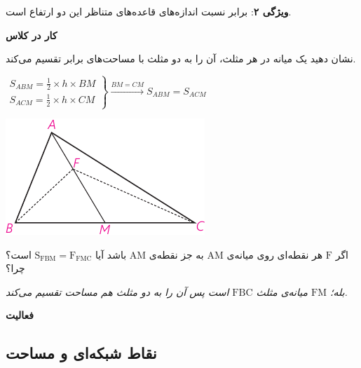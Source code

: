 \documentclass[12pt, a4paper]{book}
\begin{document}
 \bigskip

\textbf{ویژگی ۲}:
 برابر نسبت اندازه‌های قاعده‌های متناظر این دو ارتفاع است.
 \bigskip
 
 \textbf{کار در کلاس}
 
 \begin{minipage}{0.65\textwidth}
 	نشان دهید یک میانه در هر مثلث، آن را به دو مثلث با مساحت‌های برابر تقسیم می‌کند.
 	\begin{flushleft}
 		$\left.
 		\begin{array}{ccc}
 			S_{ABM} = \frac12 \times h \times BM \\
 			S_{ACM} = \frac12 \times h \times CM
 		\end{array}
 		\right\}
 		\xrightarrow{BM = CM} S_{ABM} = S_{ACM}
 		$
 	\end{flushleft}
 \end{minipage}
 \begin{minipage}{0.3\textwidth}
 	\begin{flushleft}
 		\includegraphics{"Shapes/Fasl - 3/Dars 2/P66-S1"}
 	\end{flushleft}
 \end{minipage}

اگر $\mathrm{F}$ هر نقطه‌ای روی میانه‌ی $\mathrm{AM}$ به جز نقطه‌ی $\mathrm{AM}$ باشد آیا $\mathrm{S_{FBM} = F_{FMC}}$ است؟ چرا؟

\textit{بله؛ 
	$\mathrm{FM}$
	میانه‌ی مثلث 
	$\mathrm{FBC}$
	است پس آن را به دو مثلث هم مساحت تقسیم می‌کند.}

\textbf{فعالیت}



\subsection{نقاط شبکه‌ای و مساحت}
\end{document}
